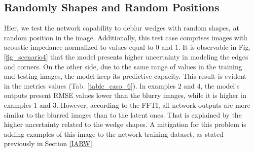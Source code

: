 \documentclass[conference]{IEEEtran}
\begin{document}
\subsection{Randomly Shapes and Random Positions}
Hier, we test the network capability to deblur wedges with random shapes, at random position in the image.
Additionally, this test case comprises images with acoustic impedance normalized to values equal to $0$ and $1$.
It is observable in Fig. \ref{fig_scenario4} that the model presents higher uncertainty
in modeling the edges and corners. On the other side, due to the same range of values
in the training and testing images, the model keep its predictive capacity. This result is evident in the metrics values
(Tab. \ref{table_caso_6}). In examples $2$ and $4$, the model's outputs present RMSE values lower than the blurry images, 
while it is higher in examples $1$ and $3$. However, according to the FFTI, all network outputs are
more similar to the blurred images than to the latent ones. That is explained by the higher uncertainty related to the wedge shapes. A mitigation for this problem is adding examples of this image to the network training dataset, as stated previously in
Section \ref{IARW}.
\end{document}
